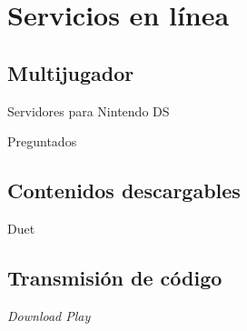 
\section{Servicios en línea}
\subsection{Multijugador}
\begin{frame}{Servidores para Nintendo DS}

\end{frame}

\begin{frame}{Preguntados}

\end{frame}

\subsection{Contenidos descargables}
\begin{frame}{Duet}

\end{frame}

\subsection{Transmisión de código}
\begin{frame}{\textit{Download Play}}

\end{frame}
